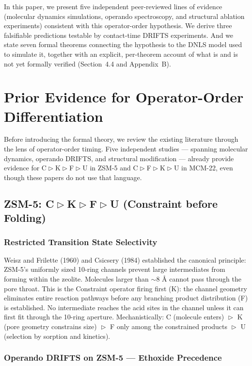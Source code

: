 \documentclass[11pt]{article}
\newcommand{\comp}{\mathrel{\triangleright}} %
\begin{document}
In this paper, we present five independent peer-reviewed lines of evidence (molecular dynamics simulations, operando spectroscopy, and structural ablation experiments) consistent with this operator-order hypothesis. We derive three falsifiable predictions testable by contact-time DRIFTS experiments. And we state seven formal theorems connecting the hypothesis to the DNLS model used to simulate it, together with an explicit, per-theorem account of what is and is not yet formally verified (Section~4.4 and Appendix~B).

\section{Prior Evidence for Operator-Order Differentiation}

Before introducing the formal theory, we review the existing literature through the lens of operator-order timing. Five independent studies --- spanning molecular dynamics, operando DRIFTS, and structural modification --- already provide evidence for C$\comp$K$\comp$F$\comp$U in ZSM-5 and C$\comp$F$\comp$K$\comp$U in MCM-22, even though these papers do not use that language.

\subsection{ZSM-5: C$\comp$K$\comp$F$\comp$U (Constraint before Folding)}

\subsubsection{Restricted Transition State Selectivity}

Weisz and Frilette (1960) and Csicsery (1984) established the canonical principle: ZSM-5's uniformly sized 10-ring channels prevent large intermediates from forming within the zeolite. Molecules larger than $\sim 8$ \AA{} cannot pass through the pore throat. This is the Constraint operator firing first (K): the channel geometry eliminates entire reaction pathways before any branching product distribution (F) is established. No intermediate reaches the acid sites in the channel unless it can first fit through the 10-ring aperture. Mechanistically: C (molecule enters) $\comp$ K (pore geometry constrains size) $\comp$ F only among the constrained products $\comp$ U (selection by sorption and kinetics).

\subsubsection{Operando DRIFTS on ZSM-5 --- Ethoxide Precedence}
\end{document}
